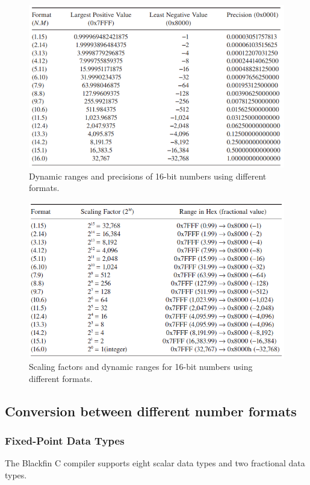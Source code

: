 \begin{figure} [H]
 	\centering
 	\includegraphics[width=\linewidth]{graphics/2.png}
 	\caption{Dynamic ranges and precisions of 16-bit numbers using different formats.}
 	\label{fig:2}
\end{figure}

\begin{figure} [H]
	\centering
	\includegraphics[width=\linewidth]{graphics/8.png}
	\caption{Scaling factors and dynamic ranges for 16-bit numbers using different formats.}
	\label{fig:8}
\end{figure}

\subsection{Conversion between different number formats}
\subsubsection{Fixed-Point Data Types}
The Blackfin C compiler supports eight scalar data types and two fractional data types.

